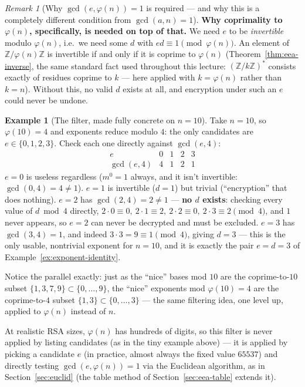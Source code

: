 \documentclass[11pt]{article}
\theoremstyle{definition}
\newtheorem{example}[theorem]{Example}
\theoremstyle{remark}
\newtheorem{remark}[theorem]{Remark}
\begin{document}
\begin{remark}[Why $\gcd(e,\varphi(n))=1$ is required — and why this is a completely different condition from $\gcd(a,n)=1$]
\medskip\noindent\textbf{Why coprimality to $\varphi(n)$, specifically, is needed on top of that.} We need $e$ to be \emph{invertible} modulo $\varphi(n)$, i.e.\ we need some $d$ with $ed \equiv 1 \pmod{\varphi(n)}$. An element of $\mathbb{Z}/\varphi(n)\mathbb{Z}$ is invertible if and only if it is coprime to $\varphi(n)$ (Theorem~\ref{thm:eea-inverse}, the same standard fact used throughout this lecture: $(\mathbb{Z}/k\mathbb{Z})^{*}$ consists exactly of residues coprime to $k$ — here applied with $k=\varphi(n)$ rather than $k=n$). Without this, no valid $d$ exists at all, and encryption under such an $e$ could never be undone.

\begin{example}[The filter, made fully concrete on $n=10$]
Take $n=10$, so $\varphi(10)=4$ and exponents reduce modulo $4$: the only candidates are $e\in\{0,1,2,3\}$. Check each one directly against $\gcd(e,4)$:
\[
\begin{array}{c|cccc}
e & 0 & 1 & 2 & 3\\
\hline
\gcd(e,4) & 4 & 1 & 2 & 1
\end{array}
\]
$e=0$ is useless regardless ($m^0=1$ always, and it isn't invertible: $\gcd(0,4)=4\ne1$). $e=1$ is invertible ($d=1$) but trivial (``encryption'' that does nothing). $e=2$ has $\gcd(2,4)=2\ne1$ — \textbf{no $d$ exists}: checking every value of $d\bmod4$ directly, $2\cdot0\equiv0,\ 2\cdot1\equiv2,\ 2\cdot2\equiv0,\ 2\cdot3\equiv2\pmod4$, and $1$ never appears, so $e=2$ can never be decrypted and must be excluded. $e=3$ has $\gcd(3,4)=1$, and indeed $3\cdot3=9\equiv1\pmod4$, giving $d=3$ — this is the only usable, nontrivial exponent for $n=10$, and it is exactly the pair $e=d=3$ of Example~\ref{ex:exponent-identity}.

Notice the parallel exactly: just as the ``nice'' bases mod $10$ are the coprime-to-$10$ subset $\{1,3,7,9\}\subset\{0,\dots,9\}$, the ``nice'' exponents mod $\varphi(10)=4$ are the coprime-to-$4$ subset $\{1,3\}\subset\{0,\dots,3\}$ — the same filtering idea, one level up, applied to $\varphi(n)$ instead of $n$.
\end{example}

At realistic RSA sizes, $\varphi(n)$ has hundreds of digits, so this filter is never applied by listing candidates (as in the tiny example above) — it is applied by picking a candidate $e$ (in practice, almost always the fixed value $65537$) and directly testing $\gcd(e,\varphi(n))=1$ via the Euclidean algorithm, as in Section~\ref{sec:euclid} (the table method of Section~\ref{sec:eea-table} extends it).
\end{remark}
\end{document}
